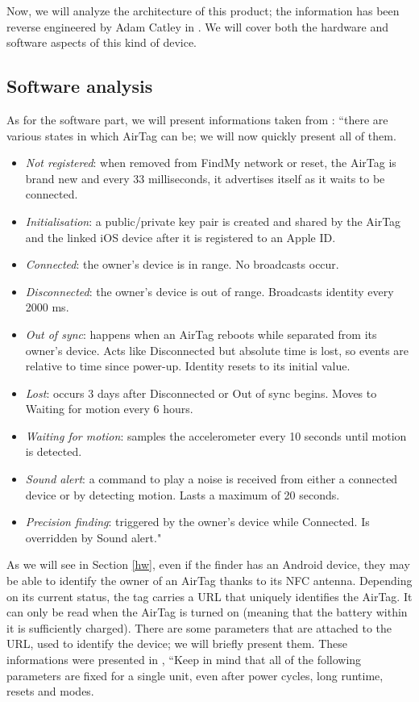 \documentclass[english]{article}
\begin{document}
Now, we will analyze the architecture of this product; the information has been reverse engineered by Adam Catley in \cite{reverse}. We will cover both the hardware and software aspects of this kind of device.
\subsection{Software analysis}\label{sec:beacons}
As for the software part, we will present informations taken from \cite{reverse}: ``there are various states in which AirTag can be; we will now quickly present all of them.
\begin{itemize}
  \item \textit{Not registered}: when removed from FindMy network or reset, the AirTag is brand new and every 33 milliseconds, it advertises itself as it waits to be connected.
  \item \textit{Initialisation}: a public/private key pair is created and shared by the AirTag and the linked iOS device after it is registered to an Apple ID.
  \item \textit{Connected}: the owner’s device is in range. No broadcasts occur.
  \item \textit{Disconnected}: the owner’s device is out of range. Broadcasts identity every 2000 ms.
  \item \textit{Out of sync}: happens when an AirTag reboots while separated from its owner’s device. Acts like Disconnected but absolute time is lost, so events are relative to time since power-up. Identity resets to its initial value.
  \item \textit{Lost}: occurs 3 days after Disconnected or Out of sync begins. Moves to Waiting for motion every 6 hours.
  \item \textit{Waiting for motion}: samples the accelerometer every 10 seconds until motion is detected.
  \item \textit{Sound alert}: a command to play a noise is received from either a connected device or by detecting motion. Lasts a maximum of 20 seconds.
  \item \textit{Precision finding}: triggered by the owner’s device while Connected. Is overridden by Sound alert."
\end{itemize}
As we will see in Section \ref{hw}, even if the finder has an Android device, they may be able to identify the owner of an AirTag thanks to its NFC antenna. Depending on its current status, the tag carries a URL that uniquely identifies the AirTag. It can only be read when the AirTag is turned on (meaning that the battery within it is sufficiently charged). There are some parameters that are attached to the URL, used to identify the device; we will briefly present them. These informations were presented in \cite{reverse}, ``Keep in mind that all of the following parameters are fixed for a single unit, even after power cycles, long runtime, resets and modes.
\end{document}
